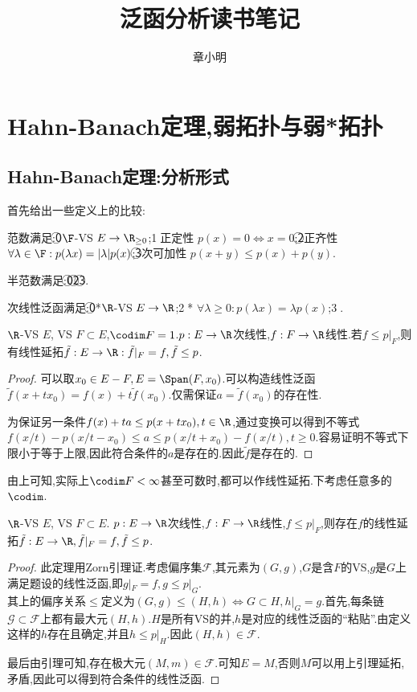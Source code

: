 \documentclass{article}
\title{泛函分析读书笔记}
\author{章小明}
\begin{document}
\maketitle
\tableofcontents

\section{Hahn-Banach定理,弱拓扑与弱*拓扑}
\subsection{Hahn-Banach定理:分析形式}
首先给出一些定义上的比较:
\begin{definition}
    范数满足:\textcircled{0}$\F$-VS $E\to \R_{\geq 0}$;\textcircled{1}正定性 $p(x)=0\iff x=0$;\textcircled{2}正齐性 $\forall \lambda\in \F:p(\lambda x)=|\lambda|p(x)$;\textcircled{3}次可加性 $p(x+y)\leq p(x)+p(y)$.

    半范数满足:\textcircled{0}\textcircled{2}\textcircled{3}.

    次线性泛函满足:\textcircled{0}*$\R$-VS $E\to \R$;\textcircled{2}* $\forall \lambda\geq 0:p(\lambda x)=\lambda p(x)$;\textcircled{3}.
\end{definition}
\begin{lemma}
    $\R$-VS $E$, VS $F\subset E$,$\codim F=1$.$p:E\to \R$次线性,$f:F\to \R$线性.若$f\leq p|_F$,则有线性延拓$\tilde{f}:E\to \R:\tilde{f}|_F=f, \tilde{f}\leq p$.
\end{lemma}
\begin{proof}
    可以取$x_0\in E-F,E=\Span(F,x_0)$.可以构造线性泛函$\tilde{f}(x+tx_0)=f(x)+t\tilde{f}(x_0)$.仅需保证$a=\tilde{f}(x_0)$的存在性.

    为保证另一条件$f(x)+ta\leq p(x+tx_0),t\in \R$,通过变换可以得到不等式$f(x/t)-p(x/t-x_0)\leq a\leq p(x/t+x_0)-f(x/t),t\geq 0$.容易证明不等式下限小于等于上限,因此符合条件的$a$是存在的.因此$\tilde{f}$是存在的.
\end{proof}
由上可知,实际上$\codim F<\infty$甚至可数时,都可以作线性延拓.下考虑任意多的$\codim$.

\begin{theorem}
    $\R$-VS $E$, VS $F\subset E$. $p:E\to \R$次线性,$f:F\to \R$线性,$f\leq p|_F$,则存在$f$的线性延拓$\tilde{f}:E\to \R, \tilde{f}|_F=f, \tilde{f}\leq p$.
\end{theorem}
\begin{proof}
    此定理用Zorn引理证.考虑偏序集$\mathcal{F}$,其元素为$(G,g)$,$G$是含$F$的VS,$g$是$G$上满足题设的线性泛函,即$g|_F\!\!=\!\!f, g\!\!\leq\!\! p|_G$.\\
    其上的偏序关系$\leq$定义为$(G,g)\leq (H,h)\iff G\subset H, h|_G=g$.首先,每条链$\mathcal{G}\subset \mathcal{F}$上都有最大元$(H,h)$.$H$是所有VS的并,$h$是对应的线性泛函的``粘贴''.由定义这样的$h$存在且确定,并且$h\leq p|_H$.因此$(H,h)\in \mathcal{F}$.

    最后由引理可知,存在极大元$(M,m)\in \mathcal{F}$.可知$E=M$,否则$M$可以用上引理延拓,矛盾,因此可以得到符合条件的线性泛函.
\end{proof}
\end{document}
